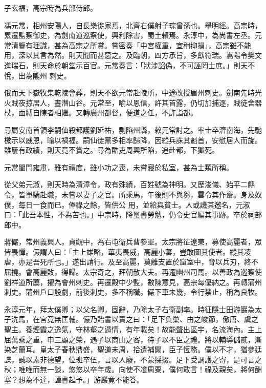 \begin{pinyinscope}
 子玄福，高宗時為兵部侍郎。



 馮元常，相州安陽人，自長樂徙家焉，北齊右僕射子琮曾孫也。舉明經。高宗時，累遷監察御史，為劍南道巡察使，興利除害，蜀土賴焉。永淳中，為尚書左丞。元常清鑒有理識，甚為高宗之所賞。嘗密奏「中宮權重，宜稍抑損」，高宗雖不能用，深以其言為然。則天聞而甚惡之。及臨朝，四方承旨，多獻符瑞。嵩陽令樊文進瑞石，則天命於朝堂示百官。元常奏言：「狀涉諂偽，不可誣罔士庶。」則天不悅，出為隴州
 刺史。



 俄而天下嶽牧集乾陵會葬，則天不欲元常赴陵所，中途改授眉州刺史。劍南先時光火賊夜掠居人，晝潛山谷。元常至，喻以恩信，許其首露，仍切加捕逐，賊徒舍器杖，面縛自陳者相繼。又轉廣州都督，便道之任，不許詣都。



 尋屬安南首領李嗣仙殺都護劉延祐，剽陷州縣，敕元常討之。率士卒濟南海，先馳檄示以威恩，喻以禍福。嗣仙徒黨多相率歸降，因縱兵誅其魁首，安慰居人而旋。雖屢有政績，則天竟不賞之。尋為酷吏周興所陷，追赴都，下獄死。



 元常閨門雍肅，雅有禮度，雖小功之喪，未嘗寢於私室，甚為士類所稱。



 從父弟元淑，則天時為清漳令，政有殊績，百姓號為神明。又歷浚儀、始平二縣令，皆單騎赴職，未嘗以妻子之官。所乘馬，午後則不與芻，雲令其作齋。身及奴僕，每日一食而已。俸祿之餘，皆供公
 用，並給與貧士。人或譏其邀名，元淑曰：「此吾本性，不為苦也。」中宗時，降璽書勞勉，仍令史官編其事跡。卒於祠部郎中。



 蔣儼，常州義興人。貞觀中，為右屯衛兵曹參軍。太宗將征遼東，募使高麗者，眾皆畏憚。儼謂人曰：「主上雄略，華夷畏威，高麗小蕃，豈敢圖其使者。縱其凌虐，亦是吾死所也。」遂出請行。及至高麗，莫離支置於窟室中，脅以兵刃，終不屈撓。會高麗敗，得歸。太宗奇之，拜朝散大夫。再遷幽州司馬。以善政為巡察使劉祥道所薦，擢為會州刺史。再遷殿中少監，數陳意見，高宗每優納之。再轉蒲州刺史。蒲州戶口殷劇，前後刺史，多不稱職。儼下車未幾，令行禁止，稱為良牧。



 永淳元年，拜太僕卿；以父名卿，固辭，乃除太子右衛副率。時征隱士田游巖為太子洗馬，在宮竟無匡輔。儼乃貽書以責之曰：「足下負巢、由之峻節，傲唐、虞之聖主。養煙霞之逸氣，守林壑之遁情，有年載矣！故能聲出區宇，名流海內。主上屈萬乘之重，申三顧之榮，遇子以商山之客，待子以不臣之禮。將以輔導儲貳，漸染芝蘭耳。皇太子春秋鼎盛，聖道未周，拾遺補闕，臣子恆務。僕以不才，猶參廷諜，誠以素非德望，位班卒伍，言以人廢，不蒙採掇。足下受調護之寄，是可言之秋；唯唯而無一談，悠悠以卒年歲。向使不飡周粟，僕何敢言！祿及親矣，將何酬塞？想為不達，謹書起予。」游巖竟不能答。




\end{pinyinscope}
